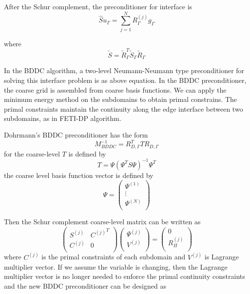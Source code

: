 After the Schur complement, the preconditioner for interface is 
\begin{equation}
\hat{S}u_{\Gamma} = \sum_{j = 1}^{N} R_{\Gamma}^{(j)} g_{\Gamma}
\end{equation}

where
\begin{equation}
\tilde{S} = \tilde{R}_{\Gamma}^{T} \tilde{S}_{\Gamma} \tilde{R}_{\Gamma}
\end{equation}

In the BDDC algorithm, a two-level Neumann-Neumann type preconditioner for solving this interface problem is as above equation. In the BDDC preconditioner, the coarse grid is assembled from coarse basis functions. We can apply the minimum energy method on the subdomains to obtain primal constrains. The primal constraints maintain the continuity along the edge interface between two subdomains, as in FETI-DP algorithm. 

Dohrmann's BDDC preconditioner \cite{dohrmann2003preconditioner, dohrmann2003study, mandel2005algebraic} has the form
\begin{equation}
M_{BDDC}^{-1} = R_{D, \Gamma}^{T} T R_{D, \Gamma}
\end{equation}
for the coarse-level $ T $ is defined by 
\begin{equation}
T = \Psi (\Psi^{T} S \Psi)^{-1} \Psi^{T}
\end{equation}
the coarse level basis function vector is defined by 
\begin{equation}
\Psi = \begin{pmatrix}
\Psi^{(1)} \\ \vdots \\ \Psi^{(N)}\\
\end{pmatrix}
\end{equation}

Then the Schur complement coarse-level matrix can be written as 
\begin{equation}
\begin{pmatrix}
S^{(j)} & {C^{(j)}}^{T} \\
C^{(j)} & 0 \\
\end{pmatrix} \begin{pmatrix}
\Psi^{(j)} \\ V^{(j)} \\
\end{pmatrix} = \begin{pmatrix}
0 \\ R_{\Pi}^{(j)}\\
\end{pmatrix}
\end{equation}
 where $ C^{(j)} $ is the primal constraints of each subdomain and $ V^{(j)} $ is Lagrange multiplier vector. If we assume the variable is changing, then the Lagrange multiplier vector is no longer needed to enforce the primal continuity constraints and the new BDDC preconditioner can be designed as
 
